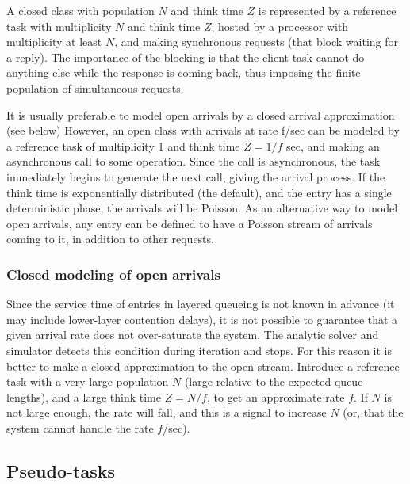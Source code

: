 \documentclass[11pt]{article}
\begin{document}
A closed class with population $N$ and think time $Z$ is represented by a reference task with
multiplicity $N$ and think time $Z$, hosted by a processor with multiplicity at least $N$, and making 
synchronous requests (that block waiting for a reply). The importance of the blocking is that the
client task cannot do anything else while the response is coming back, thus imposing the finite
population of simultaneous requests.

It is usually preferable to model open arrivals by a closed arrival approximation (see below)
However, an open class with arrivals at rate f/sec can be modeled by a reference task of multiplicity 
1 and think time $Z = 1/f$ sec, and making an asynchronous call to some operation. Since the call is
asynchronous, the task immediately begins to generate the next call, giving the arrival process. If
the think time is exponentially distributed (the default), and the entry has a single deterministic
phase, the arrivals will be Poisson. As an alternative way to model open arrivals, any entry can be
defined to have a Poisson stream of arrivals coming to it, in addition to other requests.

\subsubsection{Closed modeling of open arrivals}
Since the service time of entries in layered queueing is not 
known in advance (it may include lower-layer contention delays), it is not possible to guarantee that 
a given arrival rate does not over-saturate the system. The analytic solver and simulator detects this condition
during iteration and stops. For this reason it is better to make a closed approximation to the open stream. Introduce
a reference task with a very large population $N$ (large relative to the expected queue lengths), and 
a large think time $Z = N/f$, to get an approximate rate $f$. If $N$ is not large enough, the rate will fall, and 
this is a signal to increase $N$ (or, that the system cannot handle the rate $f$/sec).

\subsection{Pseudo-tasks}
\label{sec:pseudo-tasks}
\end{document}
